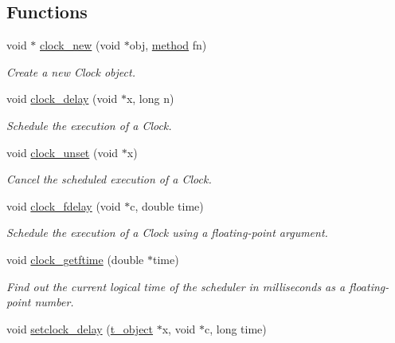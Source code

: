 \subsection*{Functions}
\begin{DoxyCompactItemize}
\item 
void $\ast$ \hyperlink{group__clocks_ga6257ddd41904756699208f135f6539fd}{clock\_\-new} (void $\ast$obj, \hyperlink{group__datatypes_gac26ba0a173b50597f5738132e059b42d}{method} fn)
\begin{DoxyCompactList}\small\item\em Create a new Clock object. \item\end{DoxyCompactList}\item 
void \hyperlink{group__clocks_ga9ac56d198904627333de740743086920}{clock\_\-delay} (void $\ast$x, long n)
\begin{DoxyCompactList}\small\item\em Schedule the execution of a Clock. \item\end{DoxyCompactList}\item 
void \hyperlink{group__clocks_ga64f5f8a027b39c1c14464744a9cc08ce}{clock\_\-unset} (void $\ast$x)
\begin{DoxyCompactList}\small\item\em Cancel the scheduled execution of a Clock. \item\end{DoxyCompactList}\item 
void \hyperlink{group__clocks_ga61719f0e0379fffbe79ae2bd5699b66f}{clock\_\-fdelay} (void $\ast$c, double time)
\begin{DoxyCompactList}\small\item\em Schedule the execution of a Clock using a floating-\/point argument. \item\end{DoxyCompactList}\item 
void \hyperlink{group__clocks_ga04a49876d29036406f857cf22b99d9ac}{clock\_\-getftime} (double $\ast$time)
\begin{DoxyCompactList}\small\item\em Find out the current logical time of the scheduler in milliseconds as a floating-\/point number. \item\end{DoxyCompactList}\item 
void \hyperlink{group__clocks_gadf4bd364fd019bed91a587337eb4801e}{setclock\_\-delay} (\hyperlink{structt__object}{t\_\-object} $\ast$x, void $\ast$c, long time)

\end{DoxyCompactItemize}
